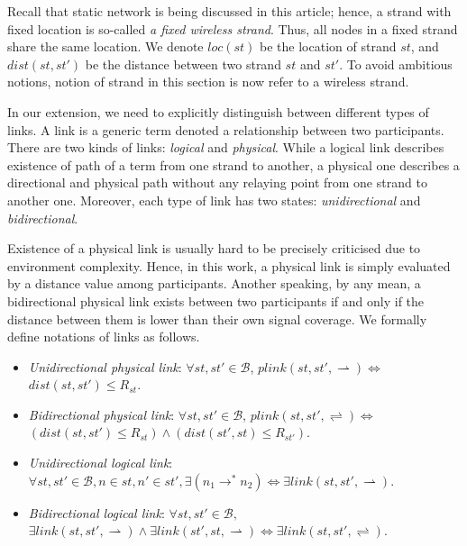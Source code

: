 Recall that static network is being discussed in this article; hence, a strand with fixed location is so-called \textit{a fixed wireless strand}. Thus, all nodes in a fixed strand share the same location. We denote $loc(st)$ be the location of strand $st$, and $dist(st,st')$ be the distance between two strand $st$ and $st'$. To avoid ambitious notions, notion of strand in this section is now refer to a wireless strand. 

In our extension, we need to explicitly distinguish between different types of links. A link is a generic term denoted a relationship between two participants. There are two kinds of links: \emph{logical} and \emph{physical}. While a logical link describes existence of path of a term from one strand to another, a physical one describes a directional and physical path without any relaying point from one strand to another one. Moreover, each type of link has two states: \emph{unidirectional} and \emph{bidirectional}. 

Existence of a physical link is usually hard to be precisely criticised due to environment complexity. Hence, in this work, a physical link is simply evaluated by a distance value among participants. Another speaking, by any mean, a bidirectional physical link exists between two participants if and only if the distance between them is lower than their own signal coverage. We formally define notations of links as follows.

\begin{Definition}
\begin{itemize}
\item \emph{Unidirectional physical link}: $\forall st,st' \in \mathcal{B}$, $plink(st,st', \rightharpoonup) \Leftrightarrow$ $dist(st,st') \le R_{st}$.
\item \emph{Bidirectional physical link}: $\forall st,st' \in \mathcal{B}$, $plink(st,st', \rightleftharpoons) \Leftrightarrow$ $(dist(st,st') \le R_{st}) \wedge (dist(st',st) \le R_{st'})$.
\item \emph{Unidirectional logical link}: $\forall st, st' \in \mathcal{B}, n \in st, n' \in st', \exists (n_1 \rightarrow^* n_2) \Leftrightarrow \exists link(st, st',\rightharpoonup)$.
\item \emph{Bidirectional logical link}: $\forall st, st' \in \mathcal{B},$ $ \exists link(st, st',\rightharpoonup) \wedge \exists link(st', st,\rightharpoonup) \Leftrightarrow \exists link(st, st',\rightleftharpoons)$.
\end{itemize}	
\end{Definition}


